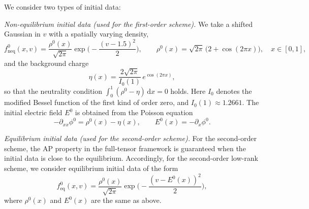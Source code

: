 \documentclass[]{article}
\numberwithin{equation}{section}
\newcommand{\dx}{\mathrm{d}x}
\begin{document}
We consider two types of initial data: 

\medskip\noindent
\emph{Non-equilibrium initial data (used for the first-order scheme).}
We take a shifted Gaussian in $v$ with a spatially varying density,
\[
  f_{\mathrm{neq}}^0(x,v)
  =\frac{\rho^0(x)}{\sqrt{2\pi}}\exp\!\Big(-\frac{(v-1.5)^2}{2}\Big),
  \qquad
  \rho^0(x)=\sqrt{2\pi}\,\big(2+\cos(2\pi x)\big),\quad x\in[0,1],
\]
and the background charge
\[
  \eta(x)=\frac{2\sqrt{2\pi}}{I_0(1)}\,e^{\cos(2\pi x)},
\]
so that the neutrality condition $\int_0^1(\rho^0-\eta)\,\dx=0$ holds. Here $I_0$ denotes the modified Bessel function of the first kind of order zero, and $I_0(1)\approx 1.2661$. 
The initial electric field $E^0$ is obtained from the Poisson equation
\[
  -\partial_{xx}\phi^0=\rho^0(x)-\eta(x),\qquad E^0(x)=-\partial_x\phi^0.
\]

\medskip\noindent
\emph{Equilibrium initial data (used for the second-order scheme).}
For the second-order scheme, the AP property in the full-tensor framework is guaranteed when the initial data is close to the equilibrium.
Accordingly, for the second-order low-rank scheme, we consider equilibrium initial data of the form
\[
  f_{\mathrm{eq}}^0(x,v) = \frac{\rho^0(x)}{\sqrt{2\pi}}\exp\!\Big(-\frac{(v-E^0(x))^2}{2}\Big),
\]
where $\rho^0(x)$ and $E^0(x)$ are the same as above.

\end{document}
